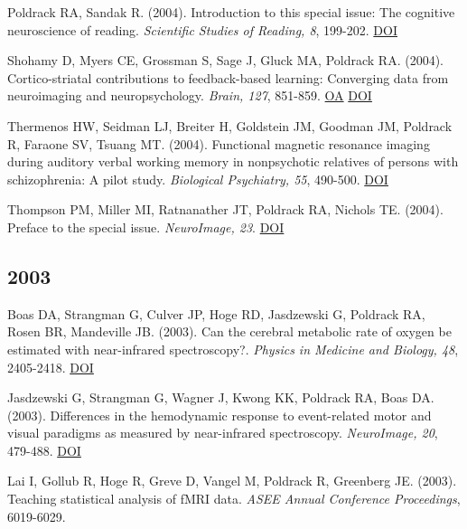 \documentclass[10pt, letterpaper]{article}
\begin{document}
Poldrack RA, Sandak R.  (2004). Introduction to this special issue: The cognitive neuroscience of reading. \textit{Scientific Studies of Reading, 8}, 199-202. \href{https://doi.org/10.1207/s1532799xssr0803_1}{DOI} \vspace{2mm}

Shohamy D, Myers CE, Grossman S, Sage J, Gluck MA, Poldrack RA.  (2004). Cortico-striatal contributions to feedback-based learning: Converging data from neuroimaging and neuropsychology. \textit{Brain, 127}, 851-859. \href{https://doi.org/10.1093/brain/awh100}{OA} \href{https://doi.org/10.1093/brain/awh100}{DOI} \vspace{2mm}

Thermenos HW, Seidman LJ, Breiter H, Goldstein JM, Goodman JM, Poldrack R, Faraone SV, Tsuang MT.  (2004). Functional magnetic resonance imaging during auditory verbal working memory in nonpsychotic relatives of persons with schizophrenia: A pilot study. \textit{Biological Psychiatry, 55}, 490-500. \href{https://doi.org/10.1016/j.biopsych.2003.11.014}{DOI} \vspace{2mm}

Thompson PM, Miller MI, Ratnanather JT, Poldrack RA, Nichols TE.  (2004). Preface to the special issue. \textit{NeuroImage, 23}. \href{https://doi.org/10.1016/j.neuroimage.2004.07.009}{DOI} \vspace{2mm}

\subsection*{2003}Boas DA, Strangman G, Culver JP, Hoge RD, Jasdzewski G, Poldrack RA, Rosen BR, Mandeville JB.  (2003). Can the cerebral metabolic rate of oxygen be estimated with near-infrared spectroscopy?. \textit{Physics in Medicine and Biology, 48}, 2405-2418. \href{https://doi.org/10.1088/0031-9155/48/15/311}{DOI} \vspace{2mm}

Jasdzewski G, Strangman G, Wagner J, Kwong KK, Poldrack RA, Boas DA.  (2003). Differences in the hemodynamic response to event-related motor and visual paradigms as measured by near-infrared spectroscopy. \textit{NeuroImage, 20}, 479-488. \href{https://doi.org/10.1016/s1053-8119(03)00311-2}{DOI} \vspace{2mm}

Lai I, Gollub R, Hoge R, Greve D, Vangel M, Poldrack R, Greenberg JE.  (2003). Teaching statistical analysis of fMRI data. \textit{ASEE Annual Conference Proceedings}, 6019-6029. \vspace{2mm}
\end{document}
